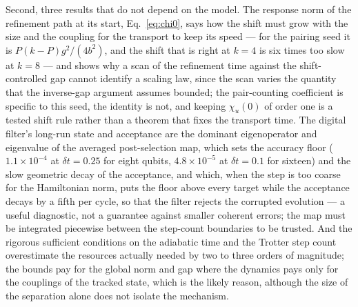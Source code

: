 \documentclass[
  aps,            %
  prc,            %
  reprint,        %
  superscriptaddress,
  floatfix,
  nofootinbib
]{revtex4-2}
\begin{document}
Second, three results that do not depend on the model.  The response norm
of the refinement path at its start, Eq.~\eqref{eq:chi0}, says how the
shift must grow with the size and the coupling for the transport to keep
its speed --- for the pairing seed it is $P(k-P)g^2/(4b^2)$, and the shift
that is right at $k=4$ is six times too slow at $k=8$ --- and shows why a
scan of the refinement time against the shift-controlled gap cannot
identify a scaling law, since the scan varies the quantity that the
inverse-gap argument assumes bounded; the pair-counting coefficient is
specific to this seed, the identity is not, and keeping $\chi_u(0)$ of
order one is a tested shift rule rather than a theorem that fixes the
transport time.  The digital filter's long-run state and acceptance are the
dominant eigenoperator and eigenvalue of the averaged post-selection map,
which sets the accuracy floor ($1.1\times10^{-4}$ at $\delta t=0.25$ for
eight qubits, $4.8\times10^{-5}$ at $\delta t=0.1$ for sixteen) and the
slow geometric decay of the acceptance, and which, when the step is too
coarse for the Hamiltonian norm, puts the floor above every target while
the acceptance decays by a fifth per cycle, so that the filter rejects the
corrupted evolution --- a useful diagnostic, not a guarantee against
smaller coherent errors; the map must be integrated piecewise between the
step-count boundaries to be trusted.  And the rigorous sufficient
conditions on the adiabatic time and the Trotter step count overestimate the
resources actually needed by two to three orders of magnitude; the bounds
pay for the global norm and gap where the dynamics pays only for the
couplings of the tracked state, which is the likely reason, although the
size of the separation alone does not isolate the mechanism.
\end{document}
